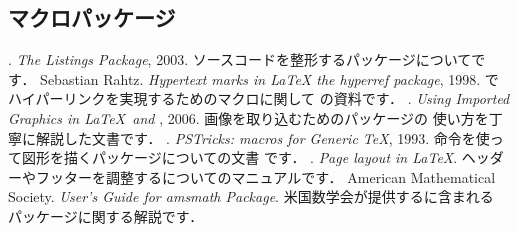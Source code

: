 \subsection{マクロパッケージ}
\begin{myreferences}
%
 . \newblock
  {\em The \textsf{Listings} Package}, 2003.
  \sanko {}
  \sanko ソースコードを整形するパッケージについてです．
%
 Sebastian Rahtz. \newblock
  {\em Hypertext marks in {\LaTeX} the hyperref package}, 1998.
  \sanko {}
  \sanko {\LaTeX}でハイパーリンクを実現するためのマクロに関して
 の資料です．
%
 . \newblock
  {\em Using Imported Graphics in \LaTeX\ and \PDFLaTeX}, 2006.
  \sanko {} 
  \sanko 画像を取り込むためのパッケージの
  使い方を丁寧に解説した文書です．
%
 . \newblock
  {\em PSTricks: {\PS} macros for Generic \TeX}, 1993. 
  \sanko  \webPSTricks
  \sanko {\PS}命令を使って図形を描くパッケージについての文書
  です．
%
 . \newblock
 \emph{Page layout in \LaTeX}. 
  \sanko {}
  \sanko ヘッダーやフッターを調整するについてのマニュアルです．
%
 American Mathematical Society.  \newblock
 \emph{User's Guide for amsmath Package}. 
 \sanko \webAmSLaTeX
 \sanko 米国数学会が提供する{\AmSLaTeX}に含まれる
 パッケージに関する解説です．
\end{myreferences}

